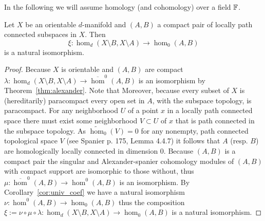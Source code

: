 In the following we will assume homology (and cohomology) over a field $\mathbb{F}$.

\begin{lemma}\label{cor:alexander_iso}
  Let $X$ be an orientable $d$-manifold and $(A,B)$ a compact pair of locally path connected subspaces in $X$.
  Then
  \[\xi : \hom_d(X\setminus B, X\setminus  A)\to \hom_0(A, B)\]
  is a natural isomorphism.
\end{lemma}
\begin{proof}
  Because $X$ is orientable and $(A,B)$ are compact $\lambda : \hom_d(X\setminus B, X\setminus A)\to \overline{\hom}^{0}(A, B)$ is an isomorphism by Theorem~\ref{thm:alexander}.
  Note that
  Moreover, because every subset of $X$ is (hereditarily) paracompact every open set in $A$, with the subspace topology, is paracompact.
  For any neighborhood $U$ of a point $x$ in a locally path connected space there must exist some neighborhood $V\subset U$ of $x$ that is path connected in the subspace topology.
  As $\tilde{\hom}_0(V) = 0$ for any nonempty, path connected topological space $V$ (see Spanier p. 175, Lemma 4.4.7) it follows that $A$ (resp. $B$) are homologically locally connected in dimension $0$.
  Because $(A,B)$ is a compact pair the singular and Alexander-spanier cohomology modules of $(A,B)$ with compact support are isomorphic to those without, thus $\mu:\overline{\hom}^{0}(A, B)\to \hom^0(A, B)$ is an isomorphism.
  By Corollary~\ref{cor:univ_coef} we have a natural isomorphism $\nu : \hom^0(A, B)\to\hom_0(A, B)$ thus the composition $\xi := \nu\circ\mu\circ\lambda : \hom_d(X\setminus B, X\setminus  A)\to \hom_0(A, B)$ is a natural isomorphism.
\end{proof}

